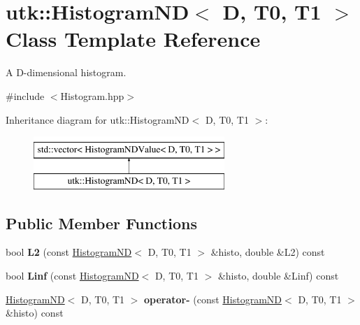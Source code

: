 \hypertarget{classutk_1_1HistogramND}{\section{utk\-:\-:Histogram\-N\-D$<$ D, T0, T1 $>$ Class Template Reference}
\label{classutk_1_1HistogramND}
}


A D-\/dimensional histogram.  




{\ttfamily \#include $<$Histogram.\-hpp$>$}

Inheritance diagram for utk\-:\-:Histogram\-N\-D$<$ D, T0, T1 $>$\-:\begin{figure}[H]
\begin{center}
\leavevmode
\includegraphics[height=2.000000cm]{classutk_1_1HistogramND}
\end{center}
\end{figure}
\subsection*{Public Member Functions}
\begin{DoxyCompactItemize}
\item 
\hypertarget{classutk_1_1HistogramND_a81114f01e01081120a793adc03513eb2}{bool {\bfseries L2} (const \hyperlink{classutk_1_1HistogramND}{Histogram\-N\-D}$<$ D, T0, T1 $>$ \&histo, double \&L2) const }\label{classutk_1_1HistogramND_a81114f01e01081120a793adc03513eb2}

\item 
\hypertarget{classutk_1_1HistogramND_a99eddddb7cdbd577903f1deb31de22b4}{bool {\bfseries Linf} (const \hyperlink{classutk_1_1HistogramND}{Histogram\-N\-D}$<$ D, T0, T1 $>$ \&histo, double \&Linf) const }\label{classutk_1_1HistogramND_a99eddddb7cdbd577903f1deb31de22b4}

\item 
\hypertarget{classutk_1_1HistogramND_a261ec42549b8fe9c16072393f299f040}{\hyperlink{classutk_1_1HistogramND}{Histogram\-N\-D}$<$ D, T0, T1 $>$ {\bfseries operator-\/} (const \hyperlink{classutk_1_1HistogramND}{Histogram\-N\-D}$<$ D, T0, T1 $>$ \&histo) const }\label{classutk_1_1HistogramND_a261ec42549b8fe9c16072393f299f040}

\end{DoxyCompactItemize}


